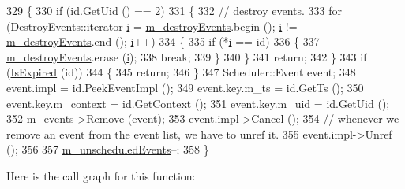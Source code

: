 \begin{DoxyCode}
329 \{
330   \textcolor{keywordflow}{if} (\textcolor{keywordtype}{id}.GetUid () == 2)
331     \{
332       \textcolor{comment}{// destroy events.}
333       \textcolor{keywordflow}{for} (DestroyEvents::iterator \hyperlink{bernuolliDistribution_8m_a6f6ccfcf58b31cb6412107d9d5281426}{i} = \hyperlink{classns3_1_1DefaultSimulatorImpl_a5082b32e009450692e94da134efe07f4}{m\_destroyEvents}.begin (); 
      \hyperlink{bernuolliDistribution_8m_a6f6ccfcf58b31cb6412107d9d5281426}{i} != \hyperlink{classns3_1_1DefaultSimulatorImpl_a5082b32e009450692e94da134efe07f4}{m\_destroyEvents}.end (); \hyperlink{bernuolliDistribution_8m_a6f6ccfcf58b31cb6412107d9d5281426}{i}++)
334         \{
335           \textcolor{keywordflow}{if} (*\hyperlink{bernuolliDistribution_8m_a6f6ccfcf58b31cb6412107d9d5281426}{i} == \textcolor{keywordtype}{id})
336             \{
337               \hyperlink{classns3_1_1DefaultSimulatorImpl_a5082b32e009450692e94da134efe07f4}{m\_destroyEvents}.erase (\hyperlink{bernuolliDistribution_8m_a6f6ccfcf58b31cb6412107d9d5281426}{i});
338               \textcolor{keywordflow}{break};
339             \}
340         \}
341       \textcolor{keywordflow}{return};
342     \}
343   \textcolor{keywordflow}{if} (\hyperlink{classns3_1_1DefaultSimulatorImpl_a60f3bef198ec0cad109219696592cb21}{IsExpired} (\textcolor{keywordtype}{id}))
344     \{
345       \textcolor{keywordflow}{return};
346     \}
347   Scheduler::Event event;
348   \textcolor{keyword}{event}.impl = \textcolor{keywordtype}{id}.PeekEventImpl ();
349   \textcolor{keyword}{event}.key.m\_ts = \textcolor{keywordtype}{id}.GetTs ();
350   \textcolor{keyword}{event}.key.m\_context = \textcolor{keywordtype}{id}.GetContext ();
351   \textcolor{keyword}{event}.key.m\_uid = \textcolor{keywordtype}{id}.GetUid ();
352   \hyperlink{classns3_1_1DefaultSimulatorImpl_a68703f6bd4940f4845dbaa49bb679d16}{m\_events}->Remove (event);
353   \textcolor{keyword}{event}.impl->Cancel ();
354   \textcolor{comment}{// whenever we remove an event from the event list, we have to unref it.}
355   \textcolor{keyword}{event}.impl->Unref ();
356 
357   \hyperlink{classns3_1_1DefaultSimulatorImpl_aac2b46d6d41340194cbd291fbcb5443e}{m\_unscheduledEvents}--;
358 \}
\end{DoxyCode}


Here is the call graph for this function\+:


